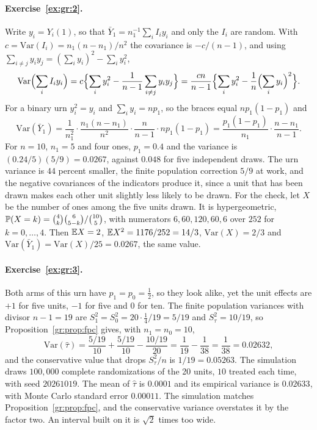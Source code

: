 \paragraph{Exercise~\ref{ex:gr:2}.} Write $y_i=Y_i(1)$, so that $\bar Y_1=n_1^{-1}\sum_iI_iy_i$ and only the $I_i$ are random. With $c=\mathrm{Var}(I_i)=n_1(n-n_1)/n^2$ the covariance is $-c/(n-1)$, and using $\sum_{i\ne j}y_iy_j=(\sum_iy_i)^2-\sum_iy_i^2$,
\[
\mathrm{Var}\Bigl(\sum_iI_iy_i\Bigr)=c\Bigl\{\sum_iy_i^2-\frac1{n-1}\sum_{i\ne j}y_iy_j\Bigr\}=\frac{cn}{n-1}\Bigl\{\sum_iy_i^2-\frac1n\Bigl(\sum_iy_i\Bigr)^2\Bigr\}.
\]
For a binary urn $y_i^2=y_i$ and $\sum_iy_i=np_1$, so the braces equal $np_1(1-p_1)$ and
\[
\mathrm{Var}(\bar Y_1)=\frac1{n_1^2}\cdot\frac{n_1(n-n_1)}{n^2}\cdot\frac{n}{n-1}\cdot np_1(1-p_1)=\frac{p_1(1-p_1)}{n_1}\cdot\frac{n-n_1}{n-1}.
\]
For $n=10$, $n_1=5$ and four ones, $p_1=0.4$ and the variance is $(0.24/5)(5/9)=0.0267$, against $0.048$ for five independent draws. The urn variance is $44$ percent smaller, the finite population correction $5/9$ at work, and the negative covariances of the indicators produce it, since a unit that has been drawn makes each other unit slightly less likely to be drawn. For the check, let $X$ be the number of ones among the five units drawn. It is hypergeometric, $\mathbb{P}(X=k)=\binom4k\binom6{5-k}/\binom{10}5$, with numerators $6,60,120,60,6$ over $252$ for $k=0,\dots,4$. Then $\mathbb{E} X=2$, $\mathbb{E} X^2=1176/252=14/3$, $\mathrm{Var}(X)=2/3$ and $\mathrm{Var}(\bar Y_1)=\mathrm{Var}(X)/25=0.0267$, the same value.

\paragraph{Exercise~\ref{ex:gr:3}.} Both arms of this urn have $p_1=p_0=\tfrac12$, so they look alike, yet the unit effects are $+1$ for five units, $-1$ for five and $0$ for ten. The finite population variances with divisor $n-1=19$ are $S_1^2=S_0^2=20\cdot\tfrac14/19=5/19$ and $S_\tau^2=10/19$, so Proposition~\ref{gr:prop:fpc} gives, with $n_1=n_0=10$,
\[
\mathrm{Var}(\hat\tau)=\frac{5/19}{10}+\frac{5/19}{10}-\frac{10/19}{20}=\frac1{19}-\frac1{38}=\frac1{38}=0.02632,
\]
and the conservative value that drops $S_\tau^2/n$ is $1/19=0.05263$. The simulation draws $100{,}000$ complete randomizations of the 20 units, $10$ treated each time, with seed $20261019$. The mean of $\hat\tau$ is $0.0001$ and its empirical variance is $0.02633$, with Monte Carlo standard error $0.00011$. The simulation matches Proposition~\ref{gr:prop:fpc}, and the conservative variance overstates it by the factor two. An interval built on it is $\sqrt2$ times too wide.


